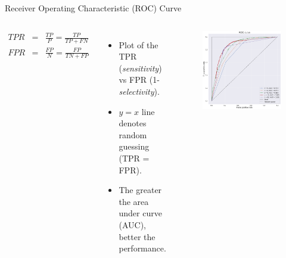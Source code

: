 \documentclass[aspectratio=169]{beamer}
\begin{document}
\begin{frame}{Receiver Operating Characteristic (ROC) Curve}
\begin{columns}
\begin{eqnarray*}
TPR & = & \frac{TP}{P} = \frac{TP}{TP + FN}\\
FPR & = & \frac{FP}{N} = \frac{FP}{TN + FP}
\end{eqnarray*}
\begin{itemize}
    \item Plot of the TPR (\textit{sensitivity}) vs FPR (1-\textit{selectivity}).
    \item $y=x$ line denotes random guessing (TPR = FPR).
    \item The greater the area under curve (AUC), better the performance.
\end{itemize}
    \begin{figure}
    \centering
    \includegraphics[width=\textwidth]{figures/ROC.png}
    \end{figure}
\end{columns}
\end{frame}
\end{document}
